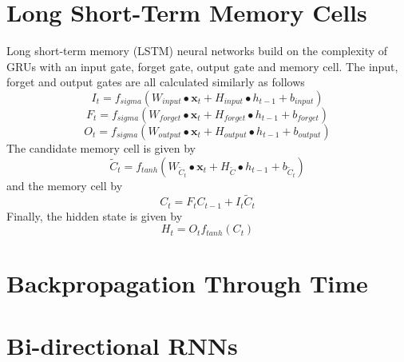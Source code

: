 \documentclass[]{article}
\begin{document}
\section{Long Short-Term Memory Cells}
Long short-term memory (LSTM) neural networks build on the complexity of GRUs with an input gate, forget gate, output gate and memory cell. The input, forget and output gates are all calculated similarly as follows
\begin{equation}
I_{t} = f_{sigma}(W_{input} \bullet \textbf{x}_{t} + H_{input} \bullet h_{t-1} + b_{input})
\end{equation}
\begin{equation}
F_{t} = f_{sigma}(W_{forget} \bullet \textbf{x}_{t} + H_{forget} \bullet h_{t-1} + b_{forget})
\end{equation}
\begin{equation}
O_{t} = f_{sigma}(W_{output} \bullet \textbf{x}_{t} + H_{output} \bullet h_{t-1} + b_{output})
\end{equation}
The candidate memory cell is given by
\begin{equation}
\tilde{C}_{t} = f_{tanh}(W_{\tilde{C}_{t}} \bullet \textbf{x}_{t} + H_{\tilde{C}} \bullet h_{t-1} + b_{\tilde{C}_{t}})
\end{equation}
and the memory cell by
\begin{equation}
C_{t} = F_{t}  C_{t-1} + I_{t} \tilde{C}_{t}
\end{equation}
Finally, the hidden state is given by
\begin{equation}
H_{t} = O_{t}f_{tanh}(C_{t})
\end{equation}

\section{Backpropagation Through Time}

\section{Bi-directional RNNs}


{}

\end{document}
